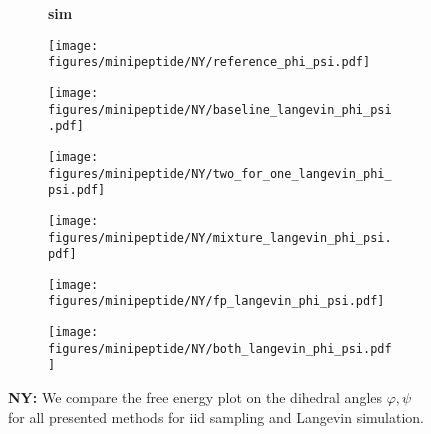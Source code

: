 \begin{figure}
    \begin{minipage}{\textwidth}
        \begin{subfigure}[c]{0.05\textwidth}
            \vspace{-0.2cm}
            \textbf{sim}
        \end{subfigure}
        \begin{subfigure}[c]{0.15\textwidth}
            \centering
            \texttt{[image: figures/minipeptide/NY/reference\_phi\_psi.pdf]}            
        \end{subfigure}
        \begin{subfigure}[c]{0.15\textwidth}
            \centering
            \texttt{[image: figures/minipeptide/NY/baseline\_langevin\_phi\_psi.pdf]}            
        \end{subfigure}
        \begin{subfigure}[c]{0.15\textwidth}
            \centering
            \texttt{[image: figures/minipeptide/NY/two\_for\_one\_langevin\_phi\_psi.pdf]}
        \end{subfigure}
        \begin{subfigure}[c]{0.15\textwidth}
            \centering
            \texttt{[image: figures/minipeptide/NY/mixture\_langevin\_phi\_psi.pdf]}
        \end{subfigure}
        \begin{subfigure}[c]{0.15\textwidth}
            \centering
            \texttt{[image: figures/minipeptide/NY/fp\_langevin\_phi\_psi.pdf]}            
        \end{subfigure}
        \begin{subfigure}[c]{0.15\textwidth}
            \centering
            \texttt{[image: figures/minipeptide/NY/both\_langevin\_phi\_psi.pdf]}            
        \end{subfigure}
    \end{minipage}
    \caption{\textbf{NY:} We compare the free energy plot on the dihedral angles $\varphi, \psi$ for all presented methods for iid sampling and Langevin simulation.}
    \label{fig:minipeptide-ny}
\end{figure}

